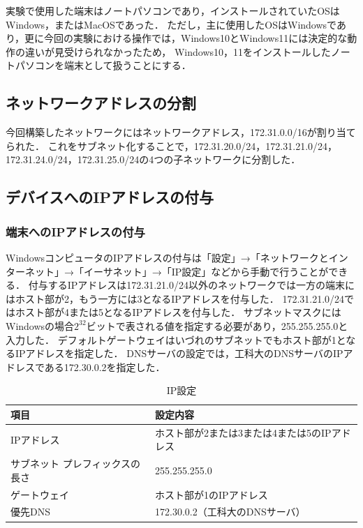 \documentclass{jlreq}
\begin{document}
実験で使用した端末はノートパソコンであり，インストールされていたOSはWindows，またはMacOSであった．
ただし，主に使用したOSはWindowsであり，更に今回の実験における操作では，Windows10とWindows11には決定的な動作の違いが見受けられなかったため，
Windows10，11をインストールしたノートパソコンを端末として扱うことにする．

\subsection{ネットワークアドレスの分割}
今回構築したネットワークにはネットワークアドレス，172.31.0.0/16が割り当てられた．
これをサブネット化することで，172.31.20.0/24，172.31.21.0/24，172.31.24.0/24，172.31.25.0/24の4つの子ネットワークに分割した．

\subsection{デバイスへのIPアドレスの付与}
\subsubsection{端末へのIPアドレスの付与}
WindowsコンピュータのIPアドレスの付与は「設定」→「ネットワークとインターネット」→「イーサネット」→「IP設定」などから手動で行うことができる．
付与するIPアドレスは172.31.21.0/24以外のネットワークでは一方の端末にはホスト部が2，もう一方には3となるIPアドレスを付与した．
172.31.21.0/24ではホスト部が4または5となるIPアドレスを付与した．
サブネットマスクにはWindowsの場合$2^{32}$ビットで表される値を指定する必要があり，255.255.255.0と入力した．
デフォルトゲートウェイはいづれのサブネットでもホスト部が1となるIPアドレスを指定した．
DNSサーバの設定では，工科大のDNSサーバのIPアドレスである172.30.0.2を指定した．

\begin{table}[h]
    \centering
    \begin{tabular}{|l|l|}
        \hline
        \rowcolor[gray]{0.9}
        項目 & 設定内容 \\ \hline \hline
        IPアドレス & ホスト部が2または3または4または5のIPアドレス \\ \hline
        サブネット プレフィックスの長さ & 255.255.255.0 \\ \hline
        ゲートウェイ & ホスト部が1のIPアドレス \\ \hline
        優先DNS & 172.30.0.2（工科大のDNSサーバ）\\ \hline
    \end{tabular}
    \caption{IP設定}
\end{table}
\end{document}
